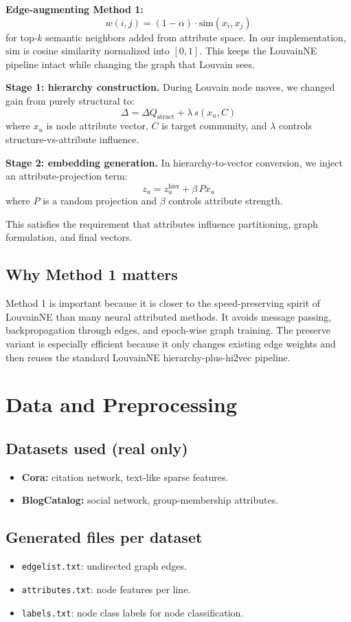 \documentclass[10pt,twoside,twocolumn]{article}
\begin{document}
\textbf{Edge-augmenting Method 1:}
\[
w(i,j) = (1-\alpha)\cdot \mathrm{sim}(x_i, x_j)
\]
for top-$k$ semantic neighbors added from attribute space. In our implementation, $\mathrm{sim}$ is cosine similarity normalized into $[0,1]$. This keeps the LouvainNE pipeline intact while changing the graph that Louvain sees.

\textbf{Stage 1: hierarchy construction.}
During Louvain node moves, we changed gain from purely structural to:
\[
\Delta = \Delta Q_{\text{struct}} + \lambda\, s(x_u, C)
\]
where $x_u$ is node attribute vector, $C$ is target community, and $\lambda$ controls structure-vs-attribute influence.

\textbf{Stage 2: embedding generation.}
In hierarchy-to-vector conversion, we inject an attribute-projection term:
\[
z_u = z^{\text{hier}}_u + \beta\,P x_u
\]
where $P$ is a random projection and $\beta$ controls attribute strength.

This satisfies the requirement that attributes influence partitioning, graph formulation, and final vectors.

\subsection{Why Method 1 matters}
Method 1 is important because it is closer to the speed-preserving spirit of LouvainNE than many neural attributed methods. It avoids message passing, backpropagation through edges, and epoch-wise graph training. The preserve variant is especially efficient because it only changes existing edge weights and then reuses the standard LouvainNE hierarchy-plus-hi2vec pipeline.

\section{Data and Preprocessing}
\subsection{Datasets used (real only)}
\begin{itemize}
  \item \textbf{Cora:} citation network, text-like sparse features.
  \item \textbf{BlogCatalog:} social network, group-membership attributes.
\end{itemize}

\subsection{Generated files per dataset}
\begin{itemize}
  \item \texttt{edgelist.txt}: undirected graph edges.
  \item \texttt{attributes.txt}: node features per line.
  \item \texttt{labels.txt}: node class labels for node classification.
\end{itemize}
\end{document}
